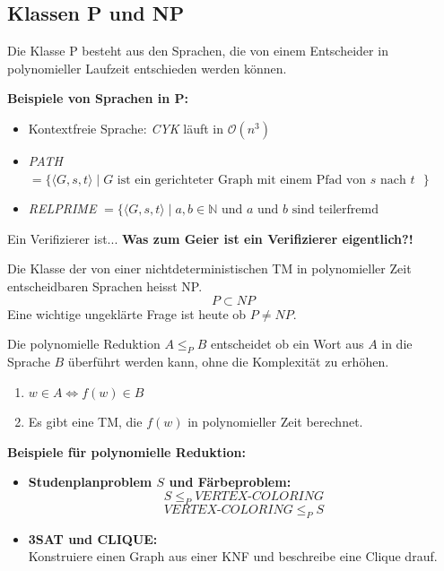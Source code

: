 \documentclass[a4paper]{article}
\begin{document}
\subsection{Klassen P und NP}
	\begin{fdef}[Klasse P]
	Die Klasse P besteht aus den Sprachen, die von einem Entscheider in polynomieller Laufzeit entschieden werden können.
	\end{fdef}
	
	\textbf{Beispiele von Sprachen in P:}
	\begin{itemize}
		\item Kontextfreie Sprache: \textit{CYK} läuft in $\mathcal{O}(n^3)$
		\item \textit{PATH} $= \{ \langle G,s,t \rangle \mid \text{$G$ ist ein gerichteter Graph mit einem Pfad von $s$ nach $t$ } \}$
		\item \textit{RELPRIME} $= \{ \langle G,s,t \rangle \mid a,b \in \mathbb{N} \text{ und $a$ und $b$ sind teilerfremd} $
	\end{itemize}

	\begin{fdef}[Verifizierer]
	Ein Verifizierer ist... \textbf{Was zum Geier ist ein Verifizierer eigentlich?!}
	\end{fdef}

	\begin{fdef}[Klasse NP]
	Die Klasse der von einer nichtdeterministischen TM in polynomieller Zeit entscheidbaren Sprachen heisst NP.
	$$P \subset NP$$
	Eine wichtige ungeklärte Frage ist heute ob $P \neq NP$.
	\end{fdef}
	
	\begin{falgo}
	Die polynomielle Reduktion $A \leq_P B$ entscheidet ob ein Wort aus $A$ in die Sprache $B$ überführt werden kann, ohne die Komplexität zu erhöhen.
	\begin{enumerate}
		\item $w \in A \Leftrightarrow f(w) \in B$
		\item Es gibt eine TM, die $f(w)$ in polynomieller Zeit berechnet.
	\end{enumerate}
	\end{falgo}
	
	\textbf{Beispiele für polynomielle Reduktion:}
	\begin{itemize}
		\item \textbf{Studenplanproblem $S$ und Färbeproblem:} 
			$$S \leq_P \textit{VERTEX-COLORING}$$
			$$\textit{VERTEX-COLORING} \leq_P S$$
		\item \textbf{3SAT und CLIQUE:} \\
			Konstruiere einen Graph aus einer KNF und beschreibe eine Clique drauf.
	\end{itemize}
	
\end{document}
